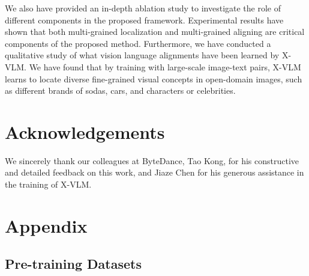 \documentclass{article}
\newcommand{\baby}{X-VLM\xspace}
\begin{document}
We also have provided an in-depth ablation study to investigate the role of different components in the proposed framework. Experimental results have shown that both multi-grained localization and multi-grained aligning are critical components of the proposed method. Furthermore, we have conducted a qualitative study of what vision language alignments have been learned by \baby. We have found that by training with large-scale image-text pairs, \baby learns to locate diverse fine-grained visual concepts in open-domain images, such as different brands of sodas, cars, and characters or celebrities.
 
\section*{Acknowledgements}
We sincerely thank our colleagues at ByteDance, Tao Kong, for his constructive and detailed feedback on this work, and Jiaze Chen for his generous assistance in the training of \baby.






































\appendix

\newpage

\section{Appendix}


\subsection{Pre-training Datasets}
\end{document}
